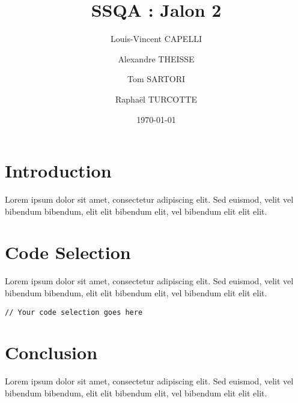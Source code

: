 \documentclass{report}
\begin{document}
\title{SSQA : Jalon 2}

\author{Louis-Vincent CAPELLI \and Alexandre THEISSE \and Tom SARTORI \and Raphaël TURCOTTE}
\date{\today}
\maketitle

\section{Introduction}
Lorem ipsum dolor sit amet, consectetur adipiscing elit. Sed euismod, velit vel bibendum bibendum, elit elit bibendum elit, vel bibendum elit elit elit. 

\section{Code Selection}
Lorem ipsum dolor sit amet, consectetur adipiscing elit. Sed euismod, velit vel bibendum bibendum, elit elit bibendum elit, vel bibendum elit elit elit. 

\begin{verbatim}
// Your code selection goes here
\end{verbatim}

\section{Conclusion}
Lorem ipsum dolor sit amet, consectetur adipiscing elit. Sed euismod, velit vel bibendum bibendum, elit elit bibendum elit, vel bibendum elit elit elit. 
\end{document}
